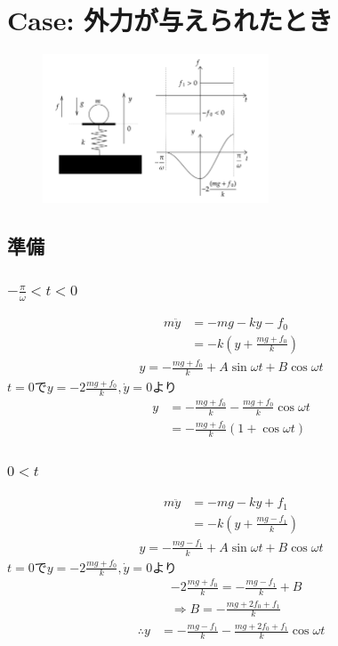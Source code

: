 \documentclass[a4paper,11pt]{jsarticle}
\begin{document}
\section{Case: 外力が与えられたとき}
\label{section:external_forcce}

\begin{figure}[h]
  \centering
  \includegraphics[width = 0.6\textwidth]{spring_given_force.png}
  \caption{}
  \label{spring_given_force.png}
\end{figure}
\subsection{準備}
\subsubsection{$-\frac{\pi}{\omega} < t < 0$}
\begin{align}
  m\ddot{y}
   & = - mg - ky - f_0
  \\
   & = -k\left( y + \frac{mg+f_0}{k} \right)
\end{align}
\begin{align}
  y = - \frac{mg+f_0}{k} + A \sin \omega t + B \cos \omega t
\end{align}
$t=0$で$y=-2\frac{mg+f_0}{k}, \dot{y} = 0$より
\begin{align}
  y
   & = - \frac{mg+f_0}{k} - \frac{mg+f_0}{k} \cos \omega t
  \\
   & = -\frac{mg+f_0}{k} \left( 1 + \cos \omega t \right)
\end{align}

\subsubsection{$0 < t$}
\begin{align}
  m\ddot{y}
   & = - mg - ky + f_1
  \\
   & = -k\left( y + \frac{mg - f_1}{k} \right)
\end{align}
\begin{align}
  y = - \frac{mg - f_1}{k} + A \sin \omega t + B \cos \omega t
\end{align}
$t=0$で$y=-2\frac{mg + f_0}{k}, \dot{y} = 0$より
\begin{align}
   & -2\frac{mg + f_0}{k} = -\frac{mg - f_1}{k} + B
  \\
   & \Rightarrow
  B = -\frac{mg + 2f_0 + f_1}{k}
\end{align}
\begin{align}
  \therefore y
   & = - \frac{mg - f_1}{k} - \frac{mg + 2f_0 + f_1}{k} \cos \omega t
\end{align}
\end{document}
